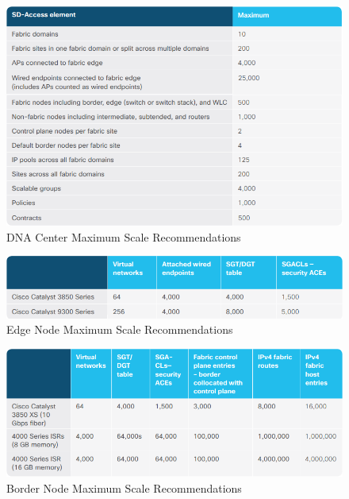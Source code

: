 \begin{figure}[H]
	\centering
	\includegraphics[width=1\linewidth]{img/Analyse/CVD-MaxScale-DNAC-1-2-5}
	\caption{DNA Center Maximum Scale Recommendations \cite{sda-designguide-sept2018} }
	\label{fig:DNA Center Maximum Scale RecommendationsA}
\end{figure}

\begin{figure}[H]
	\centering
	\includegraphics[width=1\linewidth]{img/Analyse/CVD-MaxScale-EdgeNode-1-2-5}
	\caption{Edge Node Maximum Scale Recommendations \cite{sda-designguide-sept2018} }
	\label{fig:Edge Node Maximum Scale RecommendationsA}
\end{figure}

\begin{figure}[H]
	\centering
	\includegraphics[width=1\linewidth]{img/Analyse/CVD-MaxScale-BorderNode-1-2-5}
	\caption{Border Node Maximum Scale Recommendations \cite{sda-designguide-sept2018} }
	\label{fig:Border Node Maximum Scale RecommendationsA}
\end{figure}



